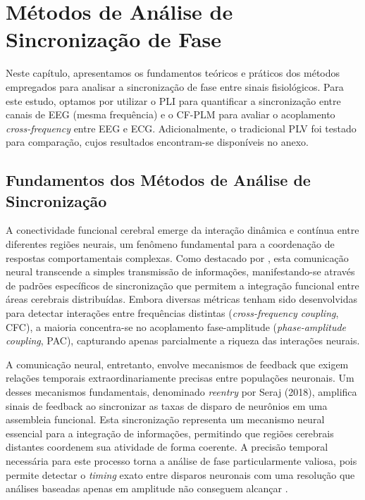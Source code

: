 \chapter{Métodos de Análise de Sincronização de Fase}
\label{chap:6_metodos_de_analise_de_sincronizacao_de_fase}
Neste capítulo, apresentamos os fundamentos teóricos e práticos dos métodos empregados para analisar a sincronização de fase entre sinais fisiológicos. Para este estudo, optamos por utilizar o PLI para quantificar a sincronização entre canais de EEG (mesma frequência) e o CF-PLM para avaliar o acoplamento \textit{cross-frequency} entre EEG e ECG. Adicionalmente, o tradicional PLV foi testado para comparação, cujos resultados encontram-se disponíveis no anexo.

\section{Fundamentos dos Métodos de Análise de Sincronização}
A conectividade funcional cerebral emerge da interação dinâmica e contínua entre diferentes regiões neurais, um fenômeno fundamental para a coordenação de respostas comportamentais complexas. Como destacado por , esta comunicação neural transcende a simples transmissão de informações, manifestando-se através de padrões específicos de sincronização que permitem a integração funcional entre áreas cerebrais distribuídas. Embora diversas métricas tenham sido desenvolvidas para detectar interações entre frequências distintas (\textit{cross-frequency coupling}, CFC), a maioria concentra-se no acoplamento fase-amplitude (\textit{phase-amplitude coupling}, PAC), capturando apenas parcialmente a riqueza das interações neurais.

A comunicação neural, entretanto, envolve mecanismos de feedback que exigem relações temporais extraordinariamente precisas entre populações neuronais. Um desses mecanismos fundamentais, denominado \emph{reentry} por Seraj (2018), amplifica sinais de feedback ao sincronizar as taxas de disparo de neurônios em uma assembleia funcional. Esta sincronização representa um mecanismo neural essencial para a integração de informações, permitindo que regiões cerebrais distantes coordenem sua atividade de forma coerente. A precisão temporal necessária para este processo torna a análise de fase particularmente valiosa, pois permite detectar o \textit{timing} exato entre disparos neuronais com uma resolução que análises baseadas apenas em amplitude não conseguem alcançar \cite{seraj2018cerebral, ren2022multi}.

